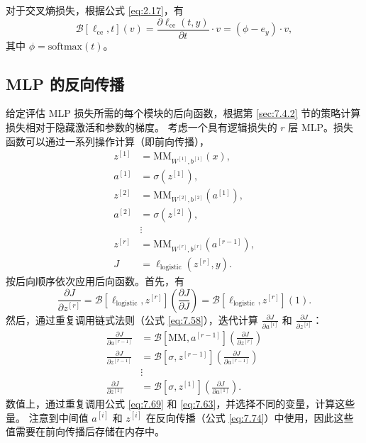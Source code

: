 对于交叉熵损失，根据公式 \eqref{eq:2.17}，有
\begin{equation}
    \mathcal{B}[\ell_{\text{ce}}, t](v) = \frac{\partial \ell_{\text{ce}}(t, y)}{\partial t} \cdot v = (\phi - e_y) \cdot v, \label{eq:7.71}
\end{equation}
其中 $\phi = \text{softmax}(t)$。

\subsection{MLP 的反向传播}\label{sec:7.4.4}

给定评估 MLP 损失所需的每个模块的后向函数，根据第 \ref{sec:7.4.2} 节的策略计算损失相对于隐藏激活和参数的梯度。
考虑一个具有逻辑损失的 $r$ 层 MLP。损失函数可以通过一系列操作计算（即前向传播），
\begin{align}
    z^{[1]} &= \text{MM}_{W^{[1]}, b^{[1]}}(x), \nonumber \\
    a^{[1]} &= \sigma(z^{[1]}), \nonumber \\
    z^{[2]} &= \text{MM}_{W^{[2]}, b^{[2]}}(a^{[1]}), \nonumber \\
    a^{[2]} &= \sigma(z^{[2]}), \nonumber \\
    &\vdots \nonumber \\
    z^{[r]} &= \text{MM}_{W^{[r]}, b^{[r]}}(a^{[r-1]}), \nonumber \\
    J &= \ell_{\text{logistic}}(z^{[r]}, y). \label{eq:7.72}
\end{align}
按后向顺序依次应用后向函数。首先，有
\begin{equation}
    \frac{\partial J}{\partial z^{[r]}} = \mathcal{B}[\ell_{\text{logistic}}, z^{[r]}]\left(\frac{\partial J}{\partial J}\right) = \mathcal{B}[\ell_{\text{logistic}}, z^{[r]}](1). \label{eq:7.73}
\end{equation}
然后，通过重复调用链式法则（公式 \eqref{eq:7.58}），迭代计算 $\frac{\partial J}{\partial a^{[i]}}$ 和 $\frac{\partial J}{\partial z^{[i]}}$：
\begin{align}
    \frac{\partial J}{\partial a^{[r-1]}} &= \mathcal{B}[\text{MM}, a^{[r-1]}]\left(\frac{\partial J}{\partial z^{[r]}}\right) \nonumber \\
    \frac{\partial J}{\partial z^{[r-1]}} &= \mathcal{B}[\sigma, z^{[r-1]}]\left(\frac{\partial J}{\partial a^{[r-1]}}\right) \nonumber \\
    &\vdots \nonumber \\
    \frac{\partial J}{\partial z^{[1]}} &= \mathcal{B}[\sigma, z^{[1]}]\left(\frac{\partial J}{\partial a^{[1]}}\right). \label{eq:7.74}
\end{align}
数值上，通过重复调用公式 \eqref{eq:7.69} 和 \eqref{eq:7.63}，并选择不同的变量，计算这些量。
注意到中间值 $a^{[i]}$ 和 $z^{[i]}$ 在反向传播（公式 \eqref{eq:7.74}）中使用，因此这些值需要在前向传播后存储在内存中。

